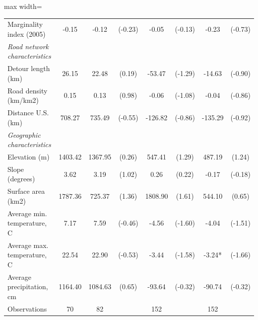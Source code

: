 \begin{adjustbox}{max width=\textwidth}
\begin{tabular}{lccccccc}
Marginality index (2005) & -0.15 & -0.12 & (-0.23) & -0.05 & (-0.13) & -0.23 & (-0.73) \\
\addlinespace
\textit{Road network characteristics} &  &  &  &  &  &  &  \\
Detour length (km) & 26.15 & 22.48 & (0.19) & -53.47 & (-1.29) & -14.63 & (-0.90) \\
Road density (km/km2) & 0.15 & 0.13 & (0.98) & -0.06 & (-1.08) & -0.04 & (-0.86) \\
Distance U.S. (km) & 708.27 & 735.49 & (-0.55) & -126.82 & (-0.86) & -135.29 & (-0.92) \\
\addlinespace
\textit{Geographic characteristics} &  &  &  &  &  &  &  \\
Elevation (m) & 1403.42 & 1367.95 & (0.26) & 547.41 & (1.29) & 487.19 & (1.24) \\
Slope (degrees) & 3.62 & 3.19 & (1.02) & 0.26 & (0.22) & -0.17 & (-0.18) \\
Surface area (km2) & 1787.36 & 725.37 & (1.36) & 1808.90 & (1.61) & 544.10 & (0.65) \\
Average min. temperature, C & 7.17 & 7.59 & (-0.46) & -4.56 & (-1.60) & -4.04 & (-1.51) \\
Average max. temperature, C & 22.54 & 22.90 & (-0.53) & -3.44 & (-1.58) & -3.24* & (-1.66) \\
Average precipitation, cm & 1164.40 & 1084.63 & (0.65) & -93.64 & (-0.32) & -90.74 & (-0.32) \\
Observations & 70 & 82 &  & 152 &  & 152 &  \\
\bottomrule
\end{tabular}
\end{adjustbox}
